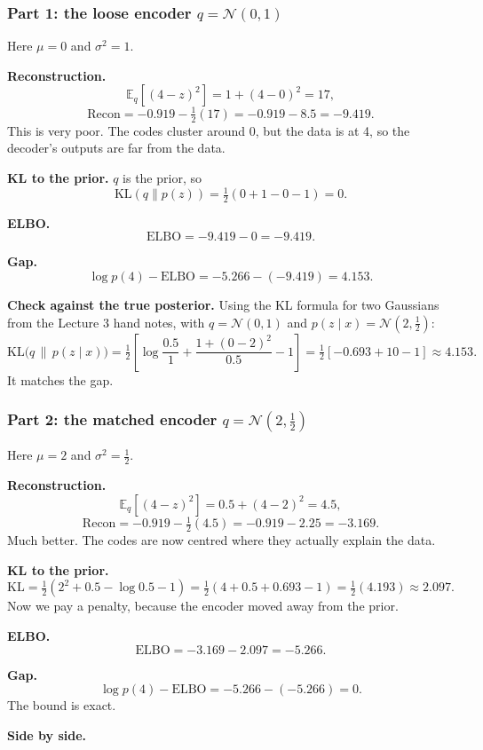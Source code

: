\documentclass[12pt,a4paper]{article}
\begin{document}
\subsubsection{Part 1: the loose encoder $q = \mathcal{N}(0, 1)$}

Here $\mu = 0$ and $\sigma^2 = 1$.

\textbf{Reconstruction.}
\[
\mathbb{E}_q[(4 - z)^2] = 1 + (4 - 0)^2 = 17,
\]
\[
\text{Recon} = -0.919 - \tfrac{1}{2}(17) = -0.919 - 8.5 = -9.419.
\]
This is very poor. The codes cluster around 0, but the data is at 4, so the decoder's outputs are far from the data.

\textbf{KL to the prior.} $q$ is the prior, so
\[
\mathrm{KL}(q\|p(z)) = \tfrac12(0 + 1 - 0 - 1) = 0.
\]

\textbf{ELBO.}
\[
\text{ELBO} = -9.419 - 0 = -9.419.
\]

\textbf{Gap.}
\[
\log p(4) - \text{ELBO} = -5.266 - (-9.419) = 4.153.
\]

\textbf{Check against the true posterior.} Using the KL formula for two Gaussians from the Lecture 3 hand notes, with $q = \mathcal{N}(0,1)$ and $p(z\mid x) = \mathcal{N}(2,\tfrac12)$:
\[
\mathrm{KL}\big(q\,\|\,p(z \mid x)\big) = \tfrac12\left[\log\frac{0.5}{1} + \frac{1 + (0-2)^2}{0.5} - 1\right] = \tfrac12\left[-0.693 + 10 - 1\right] \approx 4.153.
\]
It matches the gap.

\subsubsection{Part 2: the matched encoder $q = \mathcal{N}(2, \tfrac12)$}

Here $\mu = 2$ and $\sigma^2 = \tfrac12$.

\textbf{Reconstruction.}
\[
\mathbb{E}_q[(4 - z)^2] = 0.5 + (4 - 2)^2 = 4.5,
\]
\[
\text{Recon} = -0.919 - \tfrac{1}{2}(4.5) = -0.919 - 2.25 = -3.169.
\]
Much better. The codes are now centred where they actually explain the data.

\textbf{KL to the prior.}
\[
\mathrm{KL} = \tfrac{1}{2}\left(2^2 + 0.5 - \log 0.5 - 1\right) = \tfrac{1}{2}\left(4 + 0.5 + 0.693 - 1\right) = \tfrac{1}{2}(4.193) \approx 2.097.
\]
Now we pay a penalty, because the encoder moved away from the prior.

\textbf{ELBO.}
\[
\text{ELBO} = -3.169 - 2.097 = -5.266.
\]

\textbf{Gap.}
\[
\log p(4) - \text{ELBO} = -5.266 - (-5.266) = 0.
\]
The bound is exact.

\textbf{Side by side.}
\end{document}

